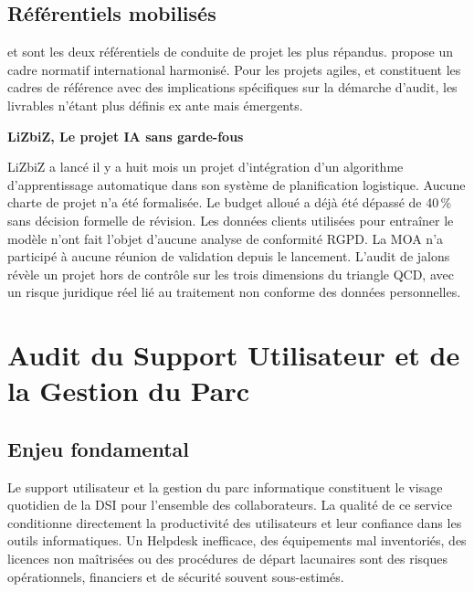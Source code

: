 \subsection{Référentiels mobilisés}

 et  sont les deux référentiels de conduite de projet les
plus répandus.  propose un cadre normatif international harmonisé.
Pour les projets agiles,  et  constituent les cadres de
référence avec des implications spécifiques sur la démarche d'audit, les livrables
n'étant plus définis ex ante mais émergents.

\begin{boxlizbiz}
\textbf{LiZbiZ, Le projet IA sans garde-fous}

LiZbiZ a lancé il y a huit mois un projet d'intégration d'un algorithme
d'apprentissage automatique dans son système de planification logistique. Aucune
charte de projet n'a été formalisée. Le budget alloué a déjà été dépassé de 40\,\%
sans décision formelle de révision. Les données clients utilisées pour entraîner le
modèle n'ont fait l'objet d'aucune analyse de conformité RGPD. La MOA n'a participé
à aucune réunion de validation depuis le lancement. L'audit de jalons révèle un projet
hors de contrôle sur les trois dimensions du triangle QCD, avec un risque juridique
réel lié au traitement non conforme des données personnelles.
\end{boxlizbiz}


\section{Audit du Support Utilisateur et de la Gestion du Parc}
\label{sec:audit-support}

\subsection{Enjeu fondamental}

Le support utilisateur et la gestion du parc informatique constituent le visage
quotidien de la DSI pour l'ensemble des collaborateurs. La qualité de ce service
conditionne directement la productivité des utilisateurs et leur confiance dans les
outils informatiques. Un Helpdesk inefficace, des équipements mal inventoriés, des
licences non maîtrisées ou des procédures de départ lacunaires sont des risques
opérationnels, financiers et de sécurité souvent sous-estimés.

